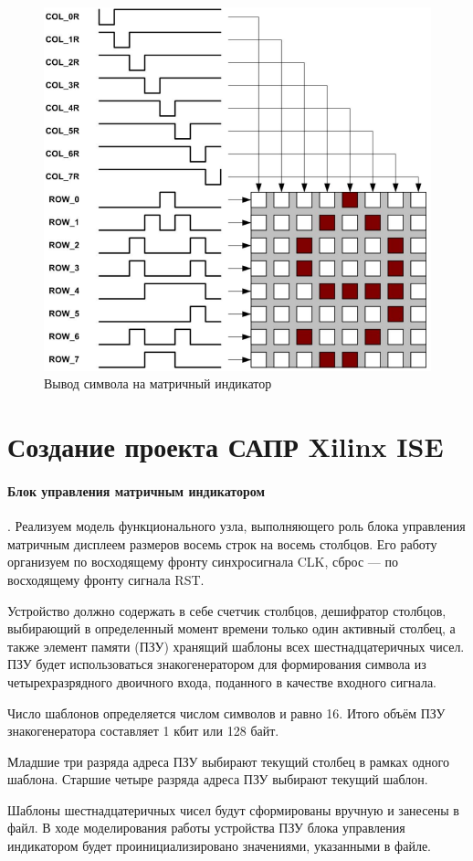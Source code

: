 \begin{figure}[h!]
	\centering
	\includegraphics[width=0.5\linewidth]{course-plis/images/lab4/display-principe}
	\caption{Вывод символа на матричный индикатор}
	\label{fig:display-principe}
\end{figure}


\section{Создание проекта САПР Xilinx ISE}

\paragraph{Блок управления матричным индикатором}.
Реализуем модель функционального узла, выполняющего роль блока управления матричным дисплеем размеров восемь строк на восемь столбцов. Его работу организуем по восходящему фронту синхросигнала CLK, сброс --- по восходящему фронту сигнала RST. 

Устройство должно содержать в себе счетчик столбцов, дешифратор столбцов, выбирающий в определенный момент времени только один активный столбец, а также элемент памяти (ПЗУ) хранящий шаблоны всех шестнадцатеричных чисел. ПЗУ будет использоваться знакогенератором для формирования символа из четырехразрядного двоичного входа, поданного в качестве входного сигнала.

Число шаблонов определяется числом символов и равно 16.
Итого объём ПЗУ знакогенератора составляет 1 кбит или 128 байт.

Младшие три разряда адреса ПЗУ выбирают текущий столбец в рамках
одного шаблона.
Старшие четыре разряда адреса ПЗУ выбирают текущий шаблон.

Шаблоны шестнадцатеричных чисел будут сформированы вручную и занесены в файл. В ходе моделирования работы устройства ПЗУ блока управления индикатором будет проинициализировано значениями, указанными в файле.

